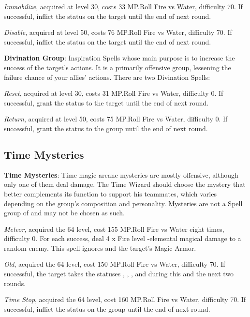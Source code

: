 \begin{multicols}{2}
    \textit{Immobilize}, acquired at level 30, costs 33 MP.\@{}Roll Fire vs Water, difficulty 70. If successful, inflict the  status on the target until the end of next round.
    
    \textit{Disable}, acquired at level 50, costs 76 MP.\@{}Roll Fire vs Water, difficulty 70. If successful, inflict the  status on the target until the end of next round.
    
    \textbf{Divination Group}: Inspiration Spells whose main purpose is to increase the success of the target’s actions. It is a primarily offensive group, lessening the failure chance of your allies’ actions. There are two Divination Spells:
    
    \textit{Reset}, acquired at level 30, costs 31 MP.\@{}Roll Fire vs Water, difficulty 0. If successful, grant the  status to the target until the end of next round.
    
    \textit{Return}, acquired at level 50, costs 75 MP.\@{}Roll Fire vs Water, difficulty 0. If successful, grant the  status to the group until the end of next round.
    
    \subsection{Time Mysteries}\label{subsec:time-mysteries}

    \textbf{Time Mysteries}: Time magic arcane mysteries are mostly offensive, although only one of them deal damage. The Time Wizard should choose the mystery that better complements its function to support his teammates, which varies depending on the group’s composition and personality. Mysteries are not a Spell group of and may not be chosen as such.
    
    \textit{Meteor}, acquired the 64 level, cost 155 MP.\@{}Roll Fire vs Water eight times, difficulty 0. For each success, deal 4 x Fire level -elemental magical damage to a random enemy. This spell ignores  and the target’s Magic Armor.
    
    \textit{Old}, acquired the 64 level, cost 150 MP.\@{}Roll Fire vs Water, difficulty 70. If successful, the target takes the statuses , , ,  and  during this and the next two rounds.
    
    \textit{Time Stop}, acquired the 64 level, cost 160 MP.\@{}Roll Fire vs Water, difficulty 70. If successful, inflict the  status on the group until the end of next round.

\end{multicols}

